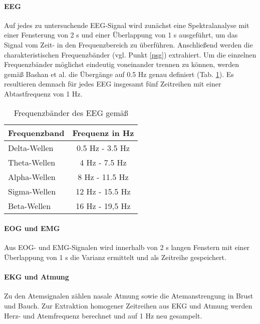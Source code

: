 \paragraph{\acs{EEG}}
Auf jedes zu untersuchende \acs{EEG}-Signal wird zunächst eine Spektralanalyse mit einer Fensterung von 2 s und einer Überlappung von 1 s ausgeführt, um das Signal vom Zeit- in den Frequenzbereich zu überführen. Anschließend werden die charakteristischen Frequenzbänder (vgl. Punkt \ref{psg}) extrahiert. Um die einzelnen Frequenzbänder möglichst eindeutig voneinander trennen zu können, werden gemäß Bashan et al. die Übergänge auf 0.5 Hz genau definiert (Tab. \ref{tab:frequenzen}). Es resultieren demnach für jedes \acs{EEG} insgesamt fünf Zeitreihen mit einer Abtastfrequenz von 1 Hz. \parencite{bashan_network_2012}\\


\begin{table}[H] 
\centering
\begin{small}
\begin{tabular}{lc}
\toprule
\multicolumn{1}{l}{\textbf{Frequenzband}} & \multicolumn{1}{c}{\textbf{Frequenz in Hz}}\\  
\midrule
Delta-Wellen & 0.5 Hz - 3.5 Hz\\
Theta-Wellen & 4 Hz - 7.5 Hz\\
Alpha-Wellen & 8 Hz - 11.5 Hz\\
Sigma-Wellen & 12 Hz - 15.5 Hz\\
Beta-Wellen & 16 Hz - 19,5 Hz\\
\bottomrule
\end{tabular}
\caption[Frequenzbänder des \acs{EEG}]{Frequenzbänder des \acs{EEG} gemäß \parencite{bashan_network_2012}}
\label{tab:frequenzen}
\end{small}
\end{table}


\paragraph{\acs{EOG} und \acs{EMG}}
Aus \acs{EOG}- und \acs{EMG}-Signalen wird innerhalb von 2 s langen Fenstern mit einer Überlappung von 1 s die Varianz ermittelt und als Zeitreihe gespeichert.\parencite{bashan_network_2012}\\

\paragraph{\acs{EKG} und Atmung}
Zu den Atemsignalen zählen nasale Atmung sowie die Atemanstrengung in Brust und Bauch. Zur Extraktion homogener Zeitreihen aus \acs{EKG} und Atmung werden Herz- und Atemfrequenz berechnet und auf 1 Hz neu gesampelt. \parencite{bashan_network_2012}\\

